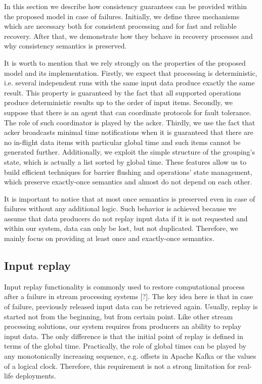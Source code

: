
\label {fs-consistency-seciton}

In this section we describe how consistency guarantees can be provided within the proposed model in case of failures. Initially, we define three mechanisms which are necessary both for consistent processing and for fast and reliable recovery. After that, we demonstrate how they behave in recovery processes and why consistency semantics is preserved.

It is worth to mention that we rely strongly on the properties of the proposed model and its implementation. Firstly, we expect that processing is deterministic, i.e. several independent runs with the same input data produce exactly the same result. This property is guaranteed by the fact that all supported operations produce deterministic results up to the order of input items. Secondly, we suppose that there is an agent that can coordinate protocols for fault tolerance. The role of such coordinator is played by the acker. Thirdly, we use the fact that acker broadcasts minimal time notifications when it is guaranteed that there are no in-flight data items with particular global time and such items cannot be generated further. Additionally, we exploit the simple structure of the grouping's state, which is actually a list sorted by global time. These features allow us to build efficient techniques for barrier flushing and operations' state management, which preserve exactly-once semantics and almost do not depend on each other.

It is important to notice that at most once semantics is preserved even in case of failures without any additional logic. Such behavior is achieved because we assume that data producers do not replay input data if it is not requested and within our system, data can only be lost, but not duplicated. Therefore, we mainly focus on providing at least once and exactly-once semantics.

\subsection{Input replay}
Input replay functionality is commonly used to restore computational process after a failure in stream processing systems [?]. The key idea here is that in case of failure, previously released input data can be retrieved again. Usually, replay is started not from the beginning, but from certain point. Like other stream processing solutions, our system requires from producers an ability to replay input data. The only difference is that the initial point of replay is defined in terms of the global time. Practically, the role of global times can be played by any monotonically increasing sequence, e.g. offsets in Apache Kafka or the values of a logical clock. Therefore, this requirement is not a strong limitation for real-life deployments.

